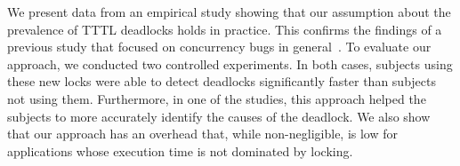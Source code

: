 We present data from an empirical study showing that our assumption about the prevalence of TTTL deadlocks holds in practice. This confirms the findings of a previous study that focused on concurrency bugs in general~\cite{lu}. 
To evaluate our approach, we conducted two controlled experiments. In both cases, subjects using these new locks were able to detect deadlocks significantly faster than subjects not using them.  Furthermore, in one of the studies, this approach helped the subjects to more accurately identify the causes of the deadlock. We also show that our approach has an overhead that, while non-negligible, is low for applications whose execution time is not dominated by locking.

